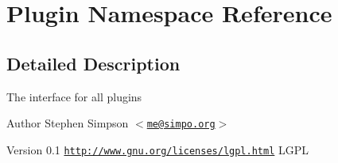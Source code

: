 \hypertarget{namespacePlugin}{
\section{Plugin Namespace Reference}
\label{namespacePlugin}
}


\subsection{Detailed Description}
The interface for all plugins

\begin{DoxyAuthor}{Author}
Stephen Simpson $<$\href{mailto:me@simpo.org}{\tt me@simpo.org}$>$ 
\end{DoxyAuthor}
\begin{DoxyVersion}{Version}
0.1  \href{http://www.gnu.org/licenses/lgpl.html}{\tt http://www.gnu.org/licenses/lgpl.html} LGPL 
\end{DoxyVersion}
